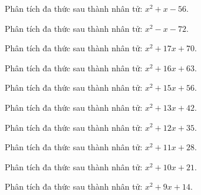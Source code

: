 \begin{bt}
	Phân tích đa thức sau thành nhân tử: $x^2 + x - 56$.
\end{bt}
\begin{bt}
	Phân tích đa thức sau thành nhân tử: $x^2 - x - 72$.
\end{bt}
\begin{bt}
	Phân tích đa thức sau thành nhân tử: $x^2 + 17 x + 70$.
\end{bt}
\begin{bt}
	Phân tích đa thức sau thành nhân tử: $x^2 + 16 x + 63$.
\end{bt}
\begin{bt}
	Phân tích đa thức sau thành nhân tử: $x^2 + 15 x + 56$.
\end{bt}
\begin{bt}
	Phân tích đa thức sau thành nhân tử: $x^2 + 13 x + 42$.
\end{bt}
\begin{bt}
	Phân tích đa thức sau thành nhân tử: $x^2 + 12 x + 35$.
\end{bt}
\begin{bt}
	Phân tích đa thức sau thành nhân tử: $x^2 + 11 x + 28$.
\end{bt}
\begin{bt}
	Phân tích đa thức sau thành nhân tử: $x^2 + 10 x + 21$.
\end{bt}
\begin{bt}
	Phân tích đa thức sau thành nhân tử: $x^2 + 9 x + 14$.
\end{bt}
